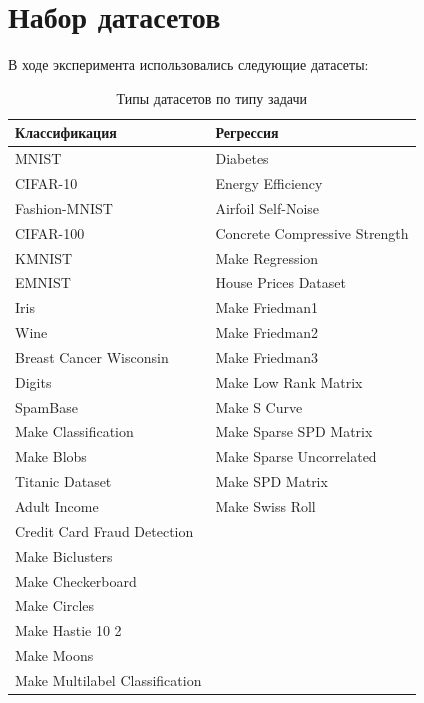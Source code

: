 \documentclass[a4paper,12pt]{article}
\begin{document}
\section{Набор датасетов}
В ходе эксперимента использовались следующие датасеты:
\begin{table}[ht]
  \centering
  \caption{Типы датасетов по типу задачи}
  \begin{tabular}{|p{}|p{}|}
    \hline
    \textbf{Классификация} & \textbf{Регрессия} \\
    \hline
    MNIST & Diabetes \\
    CIFAR-10 & Energy Efficiency \\
    Fashion-MNIST & Airfoil Self-Noise \\
    CIFAR-100 & Concrete Compressive Strength \\
    KMNIST & Make Regression \\
    EMNIST & House Prices Dataset \\
    Iris & Make Friedman1 \\
    Wine & Make Friedman2 \\
    Breast Cancer Wisconsin & Make Friedman3 \\
    Digits & Make Low Rank Matrix \\
    SpamBase & Make S Curve \\
    Make Classification & Make Sparse SPD Matrix \\
    Make Blobs & Make Sparse Uncorrelated \\
    Titanic Dataset & Make SPD Matrix \\
    Adult Income & Make Swiss Roll \\
    Credit Card Fraud Detection & \\
    Make Biclusters & \\
    Make Checkerboard & \\
    Make Circles & \\
    Make Hastie 10 2 & \\
    Make Moons & \\
    Make Multilabel Classification & \\
    \hline
  \end{tabular}
\end{table}
\end{document}
